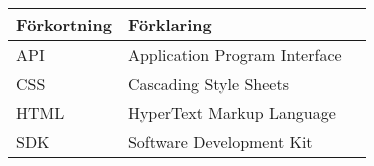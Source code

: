 \documentclass[a4paper,12pt,oneside,final]{extbook}
\begin{document}
\begin{table}[h]
  \begin{centering}
    \begin{tabular}{|l|l|l|}
    \hline
    \textbf{Förkortning} & \textbf{Förklaring} \\
    \hline
    API & Application Program Interface \\
    \hline
    CSS & Cascading Style Sheets \\
    \hline
    HTML & HyperText Markup Language \\
    \hline
    SDK & Software Development Kit \\
    \hline
    \end{tabular}
    \label{table:abbr}
  \end{centering}
\end{table}

\mainmatter








\end{document}
